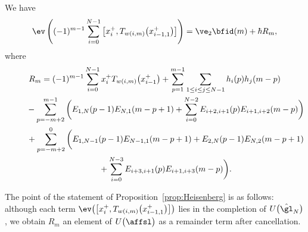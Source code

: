 \begin{prop}\label{prop:Heisenberg}
We have
\begin{gather}
\ev\left( (-1)^{m-1} \sum_{i=0}^{N-1} \big[x_{i}^+, T_{w(i,m)}\big(x_{i-1,1}^+\big)\big] \right) = \ve_2 \bfid(m) + \hbar R_m, \label{eq:Heisenberg}
\end{gather}
where
\begin{gather*}
R_m= (-1)^{m-1}\sum_{i=0}^{N-1} x_{i}^+ T_{w(i,m)}\big(x_{i-1}^+\big) + \sum_{p=1}^{m-1} \sum_{1 \leq i \leq j \leq N-1} h_i(p)h_j(m-p) \\
\hphantom{R_m=}{} - \sum_{p=-m+2}^{m-1} \bigg( E_{1,N}(p-1)E_{N,1}(m-p+1) + \sum_{i=0}^{N-2} E_{i+2,i+1}(p)E_{i+1,i+2}(m-p) \bigg) \\
\hphantom{R_m=}{} + \sum_{p=-m+2}^{0} \bigg( E_{1,N-1}(p-1)E_{N-1,1}(m-p+1) +E_{2,N}(p-1)E_{N,2}(m-p+1) \\
\hphantom{R_m=}{} + \sum_{i=0}^{N-3} E_{i+3,i+1}(p)E_{i+1,i+3}(m-p) \bigg).
\end{gather*}
\end{prop}

\begin{rem}The point of the statement of Proposition~\ref{prop:Heisenberg} is as follows: although each term $\ev\big(\big[x_{i}^+, T_{w(i,m)}\big(x_{i-1,1}^+\big)\big]\big)$ lies in the completion of $U\big(\hat{\gl}_N\big)$, we obtain $R_m$ an element of $U\big(\affsl\big)$ as a remainder term after cancellation.
\end{rem}

